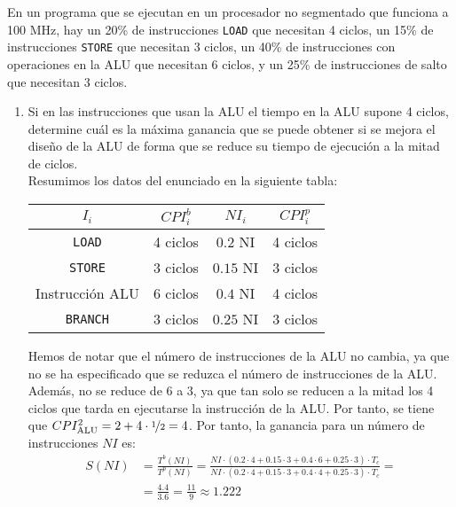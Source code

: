 \begin{ejercicio}
    En un programa que se ejecutan en un procesador no segmentado que funciona a 100 MHz, hay
    un 20\% de instrucciones \verb|LOAD| que necesitan 4 ciclos, un 15\% de instrucciones \verb|STORE| que necesitan 3 ciclos,
    un 40\% de instrucciones con operaciones en la ALU que necesitan 6 ciclos, y un 25\% de instrucciones de
    salto que necesitan 3 ciclos.
    \begin{enumerate}
        \item\label{ej:1.7a}
        Si en las instrucciones que usan la ALU el tiempo en la ALU supone 4 ciclos, determine cuál es la máxima ganancia que se puede obtener si se mejora el diseño de la ALU de forma que
        se reduce su tiempo de ejecución a la mitad de ciclos.\\

        Resumimos los datos del enunciado en la siguiente tabla:
        \begin{table}[H]
            \centering
            \begin{tabular}{c|c|c||c}
                $I_i$ & $CPI_i^b$ & $NI_i$ & $CPI_i^p$ \\
                \hline
                \verb|LOAD| & 4 ciclos & $0.2$ NI & 4 ciclos \\ 
                \verb|STORE| & 3 ciclos & $0.15$ NI & 3 ciclos \\
                Instrucción ALU & 6 ciclos & $0.4$ NI & 4 ciclos \\
                \verb|BRANCH| & 3 ciclos & $0.25$ NI & 3 ciclos
            \end{tabular}
        \end{table}
        Hemos de notar que el número de instrucciones de la ALU no cambia, ya que no se ha especificado que se reduzca el número de instrucciones de la ALU.
        Además, no se reduce de 6 a 3, ya que tan solo se reducen a la mitad los 4 ciclos que tarda en ejecutarse la instrucción de la ALU.
        Por tanto, se tiene que $CPI_{\text{ALU}}^2 = 2+4\cdot \nicefrac{1}{2} = 4$.
        Por tanto, la ganancia para un número de instrucciones $NI$ es:
        \begin{align*}
            S (NI) &= \frac{T^b(NI)}{T^p(NI)} = \frac{NI \cdot (0.2\cdot 4 + 0.15\cdot 3 + 0.4\cdot 6 + 0.25\cdot 3) \cdot T_c}{NI \cdot (0.2\cdot 4 + 0.15\cdot 3 + 0.4\cdot 4 + 0.25\cdot 3) \cdot T_c} =\\&= \frac{4.4}{3.6} = \frac{11}{9} \approx 1.222
        \end{align*}
        

\end{enumerate}
\end{ejercicio}

